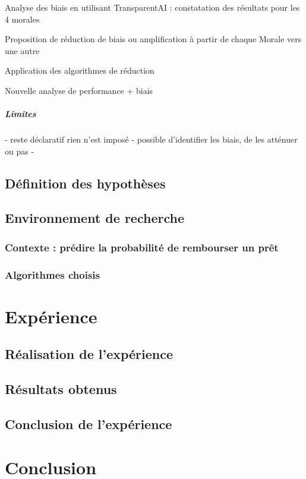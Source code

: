\documentclass[10pt, french, a4paper]{report}
\begin{document}
Analyse des biais en utilisant TransparentAI : constatation des résultats pour les 4 morales

Proposition de réduction de biais ou amplification à partir de chaque Morale vers une autre

Application des algorithmes de réduction

Nouvelle analyse de performance + biais

\paragraph{Limites} 
- reste déclaratif rien n'est imposé
- possible d'identifier les biais, de les atténuer ou pas
- 

\section{Définition des hypothèses}

\section{Environnement de recherche}

\subsection{Contexte : prédire la probabilité de rembourser un prêt}

\subsection{Algorithmes choisis}

\newpage
\chapter{Expérience}

\section{Réalisation de l'expérience}

\section{Résultats obtenus}

\section{Conclusion de l'expérience}


\newpage
\chapter*{Conclusion}

\newpage
% 


\end{document}
